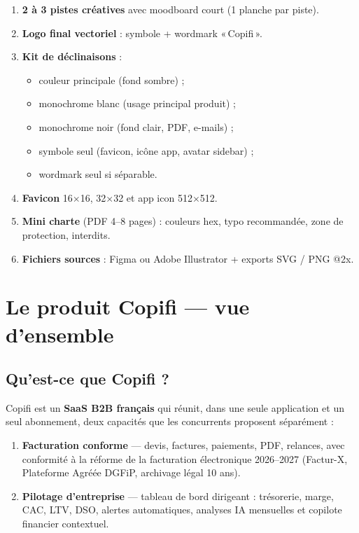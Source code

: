 \documentclass[11pt,a4paper]{report}
\newcommand{\feat}[1]{\textbf{#1}}
\begin{document}
\begin{enumerate}[leftmargin=*]
    \item \textbf{2 à 3 pistes créatives} avec moodboard court (1 planche par piste).
    \item \textbf{Logo final vectoriel} : symbole + wordmark «\,Copifi\,».
    \item \textbf{Kit de déclinaisons} :
    \begin{itemize}
        \item couleur principale (fond sombre) ;
        \item monochrome blanc (usage principal produit) ;
        \item monochrome noir (fond clair, PDF, e-mails) ;
        \item symbole seul (favicon, icône app, avatar sidebar) ;
        \item wordmark seul si séparable.
    \end{itemize}
    \item \textbf{Favicon} 16$\times$16, 32$\times$32 et app icon 512$\times$512.
    \item \textbf{Mini charte} (PDF 4--8 pages) : couleurs hex, typo recommandée, zone de protection, interdits.
    \item \textbf{Fichiers sources} : Figma ou Adobe Illustrator + exports SVG / PNG @2x.
\end{enumerate}

\chapter{Le produit Copifi — vue d'ensemble}

\section{Qu'est-ce que Copifi ?}

Copifi est un \textbf{SaaS B2B français} qui réunit, dans une seule application et un seul abonnement,
deux capacités que les concurrents proposent séparément :

\begin{enumerate}[leftmargin=*]
    \item \feat{Facturation conforme} — devis, factures, paiements, PDF, relances, avec conformité
    à la réforme de la facturation électronique 2026--2027 (Factur-X, Plateforme Agréée DGFiP,
    archivage légal 10 ans).
    \item \feat{Pilotage d'entreprise} — tableau de bord dirigeant : trésorerie, marge, CAC, LTV, DSO,
    alertes automatiques, analyses IA mensuelles et copilote financier contextuel.
\end{enumerate}
\end{document}

